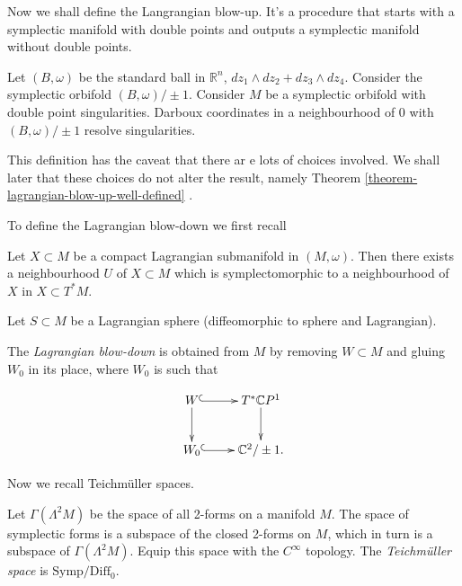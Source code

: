 \medskip\noindent
Now we shall define the Langrangian blow-up.
It's a procedure that starts with a
symplectic manifold
with double points and outputs a symplectic
manifold
without double points.

\begin{definition}
\label{definition-lagrangian-blow-up}
Let $(B,\omega)$ be the standard ball in
$\mathbb{R}^n$,
$dz_1 \wedge dz_2 +dz_3 \wedge dz_4$.
Consider the symplectic orbifold
$(B,\omega)/\pm 1$.
Consider $M$ be a symplectic orbifold
with double point singularities.
Darboux coordinates in a neighbourhood of $0$
with $(B,\omega)/\pm 1$ resolve
singularities.
\end{definition}

This definition has the caveat that there ar
e lots of choices involved.
We shall later that these choices do not
alter the result,
namely Theorem
\ref{theorem-lagrangian-blow-up-well-defined}
.

To define the Lagrangian blow-down we first
recall

\begin{theorem}
\label{theorem-weins-lagra-neigh}
Let $X \subset M$ be a compact Lagrangian
submanifold in $(M,\omega)$.
Then there exists a neighbourhood $U$ of $X
\subset M$
which is symplectomorphic to a neighbourhood
of $X$
in $X \subset T^*M$.
\end{theorem}

\noindent
Let $S \subset M$ be a Lagrangian sphere
(diffeomorphic to sphere
and Lagrangian).

\begin{definition}
\label{definition-lagrangian-blow-down}
The {\it Lagrangian blow-down} is obtained
from $M$
by removing $W \subset M$ and gluing $W_0$ in
its place,
where $W_0$ is such that

$$
\xymatrix{
W
\ar@{^{(}->}[r]\ar[d]&T^*\mathbb{C}P^1\ar[d]
\\
W_0\ar@{^{(}->}[r]&\mathbb{C}^2/\pm 1.
}
$$
\end{definition}

\medskip\noindent
Now we recall Teichmüller spaces.

Let $\Gamma(\Lambda^2M)$ be the space of all
2-forms on a manifold $M$.
The space of symplectic forms is a subspace
of the closed 2-forms on $M$,
which in turn is a subspace of
$\Gamma(\Lambda^2M)$.
Equip this space with the $C^\infty$
topology.
The {\it Teichmüller space} is
$\text{Symp}/\text{Diff}_0$.

